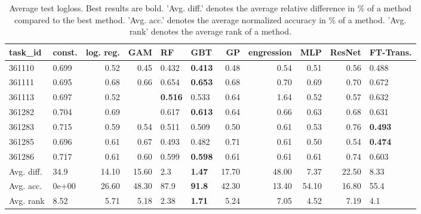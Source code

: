 \begin{table}[ht!]
\centering
\begingroup\footnotesize
\begin{tabular}{llrrllrrrrl}
  \hline
\hline
task\_id & const. & log. reg. & GAM & RF & GBT & GP & engression & MLP & ResNet & FT-Trans. \\ 
  \hline
361110 & 0.699 & 0.52 & 0.45 & 0.432 & \textbf{0.413} & 0.48 & 0.54 & 0.51 & 0.56 & 0.488 \\ 
  361111 & 0.695 & 0.68 & 0.66 & 0.654 & \textbf{0.653} & 0.68 & 0.70 & 0.69 & 0.70 & 0.672 \\ 
  361113 & 0.697 & 0.52 &  & \textbf{0.516} & 0.533 & 0.64 & 1.64 & 0.52 & 0.57 & 0.632 \\ 
  361282 & 0.704 & 0.69 &  & 0.617 & \textbf{0.613} & 0.64 & 0.66 & 0.63 & 0.68 & 0.631 \\ 
  361283 & 0.715 & 0.59 & 0.54 & 0.511 & 0.509 & 0.50 & 0.61 & 0.53 & 0.76 & \textbf{0.493} \\ 
  361285 & 0.696 & 0.61 & 0.67 & 0.493 & 0.482 & 0.71 & 0.61 & 0.50 & 0.54 & \textbf{0.474} \\ 
  361286 & 0.717 & 0.61 & 0.60 & 0.599 & \textbf{0.598} & 0.61 & 0.61 & 0.61 & 0.74 & 0.603 \\ 
   \hline
Avg. diff. & 34.9 & 14.10 & 15.60 & 2.3 & \textbf{1.47} & 17.70 & 48.00 & 7.37 & 22.50 & 8.33 \\ 
  Avg. acc. & 0e+00 & 26.60 & 48.30 & 87.9 & \textbf{91.8} & 42.30 & 13.40 & 54.10 & 16.80 & 55.4 \\ 
  Avg. rank & 8.52 & 5.71 & 5.18 & 2.38 & \textbf{1.71} & 5.24 & 7.05 & 4.52 & 7.19 & 4.1 \\ 
   \hline
\hline
\end{tabular}
\endgroup
\caption{Average test logloss. 
                  Best results are bold. 
                  'Avg. diff.' denotes the average relative difference in \% of a method compared to the best method.
                  'Avg. acc.' denotes the average normalized accuracy in \% of a method.
                  'Avg. rank' denotes the average rank of a method.} 
\label{TABLES/table_results_logloss_num_and_cat_features}
\end{table}
